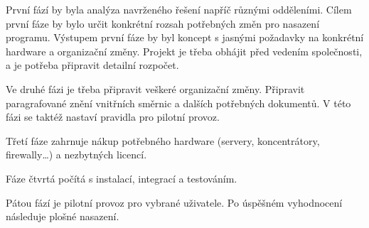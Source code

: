 První fází by byla analýza navrženého řešení napříč různými odděleními. Cílem první fáze by bylo určit konkrétní rozsah potřebných změn pro nasazení programu. Výstupem první fáze by byl koncept s jasnými požadavky na konkrétní hardware a organizační změny. Projekt je třeba obhájit před vedením společnosti, a je potřeba připravit detailní rozpočet.

Ve druhé fázi je třeba připravit veškeré organizační změny. Připravit paragrafované znění vnitřních směrnic a dalších potřebných dokumentů. V této fázi se taktéž nastaví pravidla pro pilotní provoz.

Třetí fáze zahrnuje nákup potřebného hardware (servery, koncentrátory, firewally\ldots) a nezbytných licencí.

Fáze čtvrtá počítá s instalací, integrací a testováním. 

Pátou fází je pilotní provoz pro vybrané uživatele. Po úspěšném vyhodnocení následuje plošné nasazení.